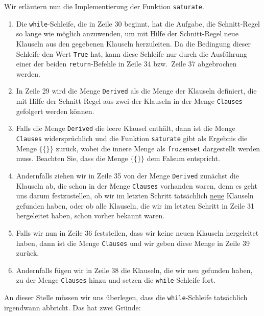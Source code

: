 Wir erläutern nun die Implementierung der Funktion \texttt{saturate}.
\begin{enumerate}
\item Die \texttt{while}-Schleife, die in Zeile 30 beginnt, hat die Aufgabe, die Schnitt-Regel
      so lange wie möglich anzuwenden, um mit Hilfe der Schnitt-Regel neue Klauseln aus den gegebenen
      Klauseln herzuleiten.  Da die Bedingung dieser Schleife den Wert \texttt{True} hat, kann diese
      Schleife nur durch die Ausführung einer der beiden \texttt{return}-Befehle in Zeile 34 bzw.~Zeile 37
      abgebrochen werden. 
\item In Zeile 29 wird die Menge \texttt{Derived} als die Menge der Klauseln definiert, die mit Hilfe der
      Schnitt-Regel aus zwei der Klauseln in der Menge \texttt{Clauses} gefolgert werden können.
\item Falls die Menge \texttt{Derived} die leere Klausel enthält, dann ist die Menge
      \texttt{Clauses} widersprüchlich und die Funktion \texttt{saturate} gibt als Ergebnis die
      Menge $\bigl\{ \{\} \bigr\}$ zurück, wobei die innere Menge als \texttt{frozenset} dargestellt werden
      muss.  Beachten Sie, dass die Menge $\bigl\{ \{\} \bigr\}$ dem Falsum entspricht.
\item Andernfalls ziehen wir in Zeile 35 von der Menge \texttt{Derived} zunächst die Klauseln
      ab, die schon in der Menge \texttt{Clauses} vorhanden waren, denn es geht uns darum
      festzustellen, ob wir im letzten Schritt tatsächlich 
      \underline{neue} Klauseln gefunden haben, oder ob alle Klauseln, die wir im letzten Schritt in Zeile 31
      hergeleitet haben, schon vorher bekannt waren.
\item Falls wir nun in Zeile 36 feststellen, dass wir keine neuen Klauseln hergeleitet haben,
      dann ist die Menge \texttt{Clauses}  und wir geben diese Menge in Zeile 39 zurück.
\item Andernfalls fügen wir in Zeile 38 die Klauseln, die wir neu gefunden haben, zu der Menge
      \texttt{Clauses} hinzu und setzen die \texttt{while}-Schleife fort.
\end{enumerate}
An dieser Stelle müssen wir uns überlegen, dass die \texttt{while}-Schleife tatsächlich irgendwann
abbricht.  Das hat zwei Gründe:  
